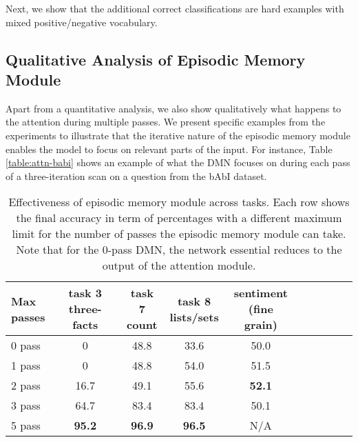 \documentclass{article}
\begin{document}
Next, we show that the additional correct classifications are hard examples with mixed positive/negative vocabulary.

\subsection{Qualitative Analysis of Episodic Memory Module}
Apart from a quantitative analysis, we also show qualitatively what happens to the attention during multiple passes. We present specific examples from the experiments to illustrate that the iterative nature of the episodic memory module enables the model to focus on relevant parts of the input. For instance, Table \ref{table:attn-babi} shows an example of what the DMN focuses on during each pass of a three-iteration scan on a question from the bAbI dataset. 


\begin{table}[t!]
\begin{center}
\begin{tabular}{l cccccccc  c}
\toprule
\pbox{20cm}{Max\\passes} & \pbox{20cm}{task 3\\three-facts} & \pbox{20cm}{task 7\\count} & \pbox{20cm}{task 8\\lists/sets} & \pbox{20cm}{ sentiment\\(fine grain)}\\ 
\midrule
0 pass & 0 & 48.8 & 33.6 & 50.0 \\
1 pass & 0 & 48.8 & 54.0 & 51.5 \\
2 pass & 16.7 & 49.1 & 55.6 & \textbf{52.1} \\
3 pass & 64.7 & 83.4 & 83.4 & 50.1 \\
5 pass & \textbf{95.2} & \textbf{96.9} & \textbf{96.5} & N/A \\
\bottomrule
\end{tabular}
\end{center}
\vspace{-0.3cm}
\caption{Effectiveness of episodic memory module across tasks. Each row shows the final accuracy in term of percentages with a different maximum limit for the number of passes the episodic memory module can take. Note that for the 0-pass DMN, the network essential reduces to the output of the attention module.}
\vspace{-0.3cm}
\label{table:episodes}
\end{table}
\end{document}
